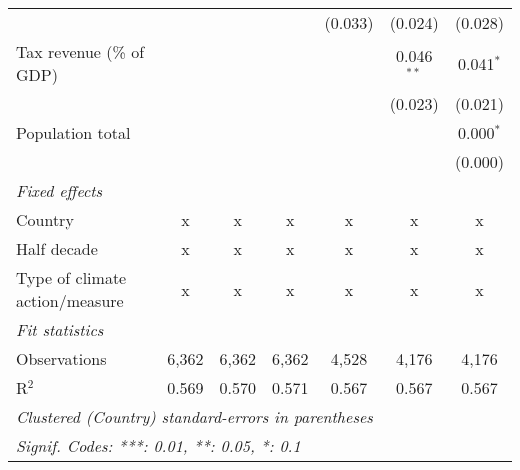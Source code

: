 \begin{tabular}{lcccccc}
                                                     &         &                &                & (0.033)        & (0.024)        & (0.028)\\   
   Tax revenue (\% of GDP)                           &         &                &                &                & 0.046$^{**}$   & 0.041$^{*}$\\   
                                                     &         &                &                &                & (0.023)        & (0.021)\\   
   Population total                                  &         &                &                &                &                & 0.000$^{*}$\\   
                                                     &         &                &                &                &                & (0.000)\\   
   \emph{Fixed effects}\\
   Country                                           & x       & x              & x              & x              & x              & x\\  
   Half decade                                       & x       & x              & x              & x              & x              & x\\  
   Type of climate action/measure                    & x       & x              & x              & x              & x              & x\\  
   \midrule \emph{Fit statistics}\\
   Observations                                      & 6,362   & 6,362          & 6,362          & 4,528          & 4,176          & 4,176\\  
   R$^2$                                             & 0.569   & 0.570          & 0.571          & 0.567          & 0.567          & 0.567\\  
   \midrule
   \multicolumn{7}{l}{\emph{Clustered (Country) standard-errors in parentheses}}\\
   \multicolumn{7}{l}{\emph{Signif. Codes: ***: 0.01, **: 0.05, *: 0.1}}\\
\end{tabular}
\par\endgroup


